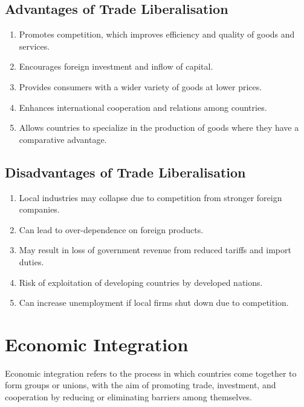 \documentclass[14pt,a4paper, openany]{book}
\begin{document}
\subsection{Advantages of Trade Liberalisation}
\begin{enumerate}
	\item Promotes competition, which improves efficiency and quality of goods and services.
	\item Encourages foreign investment and inflow of capital.
	\item Provides consumers with a wider variety of goods at lower prices.
	\item Enhances international cooperation and relations among countries.
	\item Allows countries to specialize in the production of goods where they have a comparative advantage.
\end{enumerate}

\subsection{Disadvantages of Trade Liberalisation}
\begin{enumerate}
	\item Local industries may collapse due to competition from stronger foreign companies.
	\item Can lead to over-dependence on foreign products.
	\item May result in loss of government revenue from reduced tariffs and import duties.
	\item Risk of exploitation of developing countries by developed nations.
	\item Can increase unemployment if local firms shut down due to competition.
\end{enumerate}

\section{Economic Integration}
Economic integration refers to the process in which countries come together to form groups or unions,
with the aim of promoting trade, investment, and cooperation by reducing or eliminating barriers among themselves.
\end{document}
